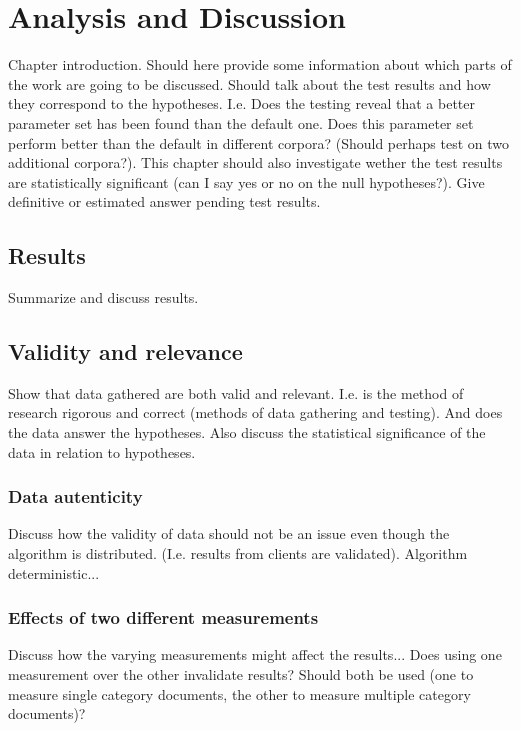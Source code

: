 
\chapter{Analysis and Discussion} %

\label{AnalysisAndDiscussion}


Chapter introduction. Should here provide some information about which parts of the work are going to be discussed.
Should talk about the test results and how they correspond to the hypotheses. I.e. Does the testing reveal that a
better parameter set has been found than the default one. Does this parameter set perform better than the default
in different corpora? (Should perhaps test on two additional corpora?). This chapter should also investigate wether
the test results are statistically significant (can I say yes or no on the null hypotheses?). Give definitive or
estimated answer pending test results.

\section{Results}
\label{Results}
Summarize and discuss results.

\section{Validity and relevance}
\label{ValidityRelevance}
Show that data gathered are both valid and relevant. I.e. is the method of research rigorous and correct (methods of data gathering and testing).
And does the data answer the hypotheses. Also discuss the statistical significance of the data in relation to hypotheses.

\subsection{Data autenticity}
Discuss how the validity of data should not be an issue even though the algorithm is distributed. (I.e. results from clients are validated).
Algorithm deterministic...

\subsection{Effects of two different measurements}
Discuss how the varying measurements might affect the results... Does using one measurement over the
other invalidate results? Should both be used (one to measure single category documents, the other to 
measure multiple category documents)?